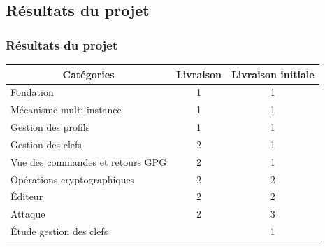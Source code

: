   \subsection{Résultats du projet}
  \begin{frame}
    \frametitle{\color{white}Résultats du projet}
  \begin{tabular}{|l|l|l|}
    \hline
    \multicolumn{1}{|c|}{\cellcolor{gray} \color{white}Catégories} & \multicolumn{1}{|c|}{\cellcolor{gray} \color{white}Livraison} & \multicolumn{1}{|c|}{\cellcolor{gray} \color{white}Livraison initiale} \\
    \hline
    \cellcolor{white}\color{green}Fondation & \multicolumn{1}{|c|}{\cellcolor{white}\color{black}1} & \multicolumn{1}{|c|}{\cellcolor{white}\color{black}1} \\
    \hline
    \cellcolor{white}\color{green}Mécanisme multi-instance & \multicolumn{1}{|c|}{\cellcolor{white}\color{black}1} & \multicolumn{1}{|c|}{\cellcolor{white}\color{black}1} \\    
    \hline
    \cellcolor{white}\color{green}Gestion des profils & \multicolumn{1}{|c|}{\cellcolor{white}\color{black}1} & \multicolumn{1}{|c|}{\cellcolor{white}\color{black}1} \\
    \hline
    \cellcolor{white}\color{yellow}Gestion des clefs & \multicolumn{1}{|c|}{\cellcolor{white}\color{black}2} & \multicolumn{1}{|c|}{\cellcolor{white}\color{black}1} \\
    \hline
    \cellcolor{white}\color{green}Vue des commandes et retours GPG & \multicolumn{1}{|c|}{\cellcolor{white}\color{black}2} & \multicolumn{1}{|c|}{\cellcolor{white}\color{black}1} \\
    \hline
    \cellcolor{white}\color{yellow}Opérations cryptographiques & \multicolumn{1}{|c|}{\cellcolor{white}\color{black}2} & \multicolumn{1}{|c|}{\cellcolor{white}\color{black}2} \\
    \hline
    \cellcolor{white}\color{yellow}\'{E}diteur & \multicolumn{1}{|c|}{\cellcolor{white}\color{black}2} & \multicolumn{1}{|c|}{\cellcolor{white}\color{black}2} \\
    \hline
    \cellcolor{white}\color{red}Attaque & \multicolumn{1}{|c|}{\cellcolor{white}\color{black}2} & \multicolumn{1}{|c|}{\cellcolor{white}\color{black}3} \\
    \hline
    \cellcolor{white}\color{red}\'{E}tude gestion des clefs & \multicolumn{1}{|c|}{\cellcolor{white}\color{black}} & \multicolumn{1}{|c|}{\cellcolor{white}\color{black}1} \\

\end{tabular}
\end{frame}
